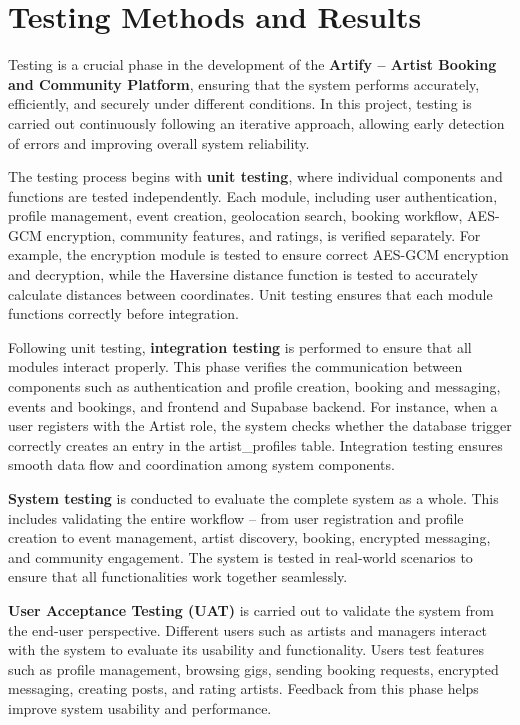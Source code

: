 \documentclass[12pt,a4paper]{report}
\begin{document}
\section{Testing Methods and Results}

Testing is a crucial phase in the development of the \textbf{Artify -- Artist Booking and Community Platform}, ensuring that the system performs accurately, efficiently, and securely under different conditions. In this project, testing is carried out continuously following an iterative approach, allowing early detection of errors and improving overall system reliability.

The testing process begins with \textbf{unit testing}, where individual components and functions are tested independently. Each module, including user authentication, profile management, event creation, geolocation search, booking workflow, AES-GCM encryption, community features, and ratings, is verified separately. For example, the encryption module is tested to ensure correct AES-GCM encryption and decryption, while the Haversine distance function is tested to accurately calculate distances between coordinates. Unit testing ensures that each module functions correctly before integration.

Following unit testing, \textbf{integration testing} is performed to ensure that all modules interact properly. This phase verifies the communication between components such as authentication and profile creation, booking and messaging, events and bookings, and frontend and Supabase backend. For instance, when a user registers with the Artist role, the system checks whether the database trigger correctly creates an entry in the artist\_profiles table. Integration testing ensures smooth data flow and coordination among system components.

\textbf{System testing} is conducted to evaluate the complete system as a whole. This includes validating the entire workflow -- from user registration and profile creation to event management, artist discovery, booking, encrypted messaging, and community engagement. The system is tested in real-world scenarios to ensure that all functionalities work together seamlessly.

\textbf{User Acceptance Testing (UAT)} is carried out to validate the system from the end-user perspective. Different users such as artists and managers interact with the system to evaluate its usability and functionality. Users test features such as profile management, browsing gigs, sending booking requests, encrypted messaging, creating posts, and rating artists. Feedback from this phase helps improve system usability and performance.
\end{document}
